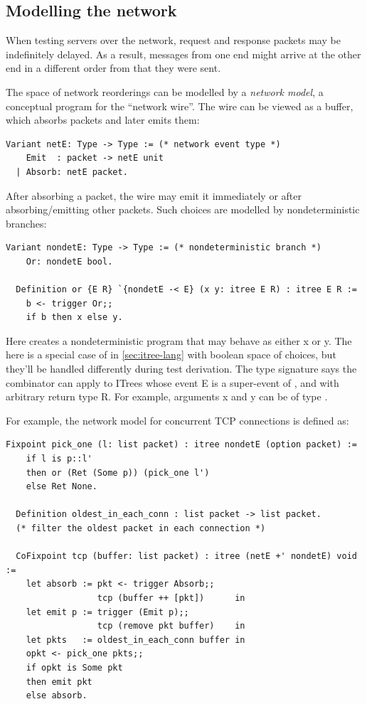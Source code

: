 \subsection{Modelling the network}
\label{sec:net-tcp}
When testing servers over the network, request and response packets may be
indefinitely delayed.  As a result, messages from one end might arrive at the
other end in a different order from that they were sent.

The space of network reorderings can be modelled by a {\em network model}, a
conceptual program for the ``network wire''.  The wire can be viewed as a
buffer, which absorbs packets and later emits them:
\begin{lstlisting}[style=customcoq]
  Variant netE: Type -> Type := (* network event type *)
    Emit  : packet -> netE unit
  | Absorb: netE packet.
\end{lstlisting}

After absorbing a packet, the wire may emit it immediately or after
absorbing/emitting other packets.  Such choices are modelled by nondeterministic
 branches:
\begin{lstlisting}[style=customcoq]
  Variant nondetE: Type -> Type := (* nondeterministic branch *)
    Or: nondetE bool.

  Definition or {E R} `{nondetE -< E} (x y: itree E R) : itree E R :=
    b <- trigger Or;;
    if b then x else y.
\end{lstlisting}

Here  creates a nondeterministic program that may behave as either
\ilc x or \ilc y.  The  here is a special case of  in
\autoref{sec:itree-lang} with boolean space of choices, but they'll be handled
differently during test derivation.  The type signature  says the  combinator can apply to ITrees whose event \ilc E
is a super-event of , and with arbitrary return type \ilc R.  For
example, arguments \ilc x and \ilc y can be of type .

For example, the network model for concurrent TCP connections is defined as:
\begin{lstlisting}[style=customcoq]
  Fixpoint pick_one (l: list packet) : itree nondetE (option packet) :=
    if l is p::l'
    then or (Ret (Some p)) (pick_one l')
    else Ret None.

  Definition oldest_in_each_conn : list packet -> list packet.
  (* filter the oldest packet in each connection *)

  CoFixpoint tcp (buffer: list packet) : itree (netE +' nondetE) void :=
    let absorb := pkt <- trigger Absorb;;
                  tcp (buffer ++ [pkt])      in
    let emit p := trigger (Emit p);;
                  tcp (remove pkt buffer)    in
    let pkts   := oldest_in_each_conn buffer in
    opkt <- pick_one pkts;;
    if opkt is Some pkt
    then emit pkt
    else absorb.
\end{lstlisting}

